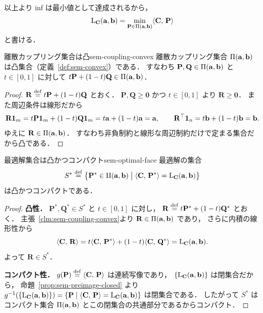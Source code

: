 以上より inf は最小値として達成されるから，
\[
  \mathrm{L}_{\mathbf{C}}(\mathbf{a}, \mathbf{b})
  = \min_{\mathbf{P} \in \Pi(\mathbf{a}, \mathbf{b})} \langle \mathbf{C},\, \mathbf{P} \rangle
\]
と書ける．

\begin{claim}{離散カップリング集合は凸}{sem-coupling-convex}
  離散カップリング集合 $\Pi(\mathbf{a}, \mathbf{b})$ は凸集合（定義~\ref{def:sem-convex}）である．
  すなわち $\mathbf{P}, \mathbf{Q} \in \Pi(\mathbf{a}, \mathbf{b})$ と
  $t \in [0,1]$ に対して
  $t\mathbf{P} + (1-t)\mathbf{Q} \in \Pi(\mathbf{a}, \mathbf{b})$．
\end{claim}

\begin{proof}
  $\mathbf{R} \overset{\mathrm{def}}{=} t\mathbf{P} + (1-t)\mathbf{Q}$ とおく．
  $\mathbf{P}, \mathbf{Q} \geq \mathbf{0}$ かつ $t \in [0,1]$ より $\mathbf{R} \geq \mathbf{0}$．
  また周辺条件は線形だから
  \[
    \mathbf{R}\mathbf{1}_m
    = t\mathbf{P}\mathbf{1}_m + (1-t)\mathbf{Q}\mathbf{1}_m
    = t\mathbf{a} + (1-t)\mathbf{a} = \mathbf{a},
    \qquad
    \mathbf{R}^\top\mathbf{1}_n
    = t\mathbf{b} + (1-t)\mathbf{b} = \mathbf{b}.
  \]
  ゆえに $\mathbf{R} \in \Pi(\mathbf{a}, \mathbf{b})$．
  すなわち非負制約と線形な周辺制約だけで定まる集合だから凸である．
\end{proof}

\begin{claim}{最適解集合は凸かつコンパクト}{sem-optimal-face}
  最適解の集合
  \[
    S^*
    \overset{\mathrm{def}}{=}
    \bigl\{ \mathbf{P}^* \in \Pi(\mathbf{a}, \mathbf{b})
    \bigm|
    \langle \mathbf{C},\, \mathbf{P}^* \rangle = \mathrm{L}_{\mathbf{C}}(\mathbf{a}, \mathbf{b})
    \bigr\}
  \]
  は凸かつコンパクトである．
\end{claim}

\begin{proof}
  \textbf{凸性．}
  $\mathbf{P}^*, \mathbf{Q}^* \in S^*$ と $t \in [0,1]$ に対し，
  $\mathbf{R} \overset{\mathrm{def}}{=} t\mathbf{P}^* + (1-t)\mathbf{Q}^*$ とおく．
  主張~\ref{clm:sem-coupling-convex}より $\mathbf{R} \in \Pi(\mathbf{a}, \mathbf{b})$ であり，
  さらに内積の線形性から
  \[
    \langle \mathbf{C},\, \mathbf{R} \rangle
    = t\langle \mathbf{C},\, \mathbf{P}^* \rangle + (1-t)\langle \mathbf{C},\, \mathbf{Q}^* \rangle
    = \mathrm{L}_{\mathbf{C}}(\mathbf{a}, \mathbf{b}).
  \]
  よって $\mathbf{R} \in S^*$．

  \textbf{コンパクト性．}
  $g(\mathbf{P}) \overset{\mathrm{def}}{=} \langle \mathbf{C},\, \mathbf{P} \rangle$ は連続写像であり，
  $\{\mathrm{L}_{\mathbf{C}}(\mathbf{a},\mathbf{b})\}$ は閉集合だから，
  命題~\ref{prop:sem-preimage-closed} より
  $g^{-1}(\{\mathrm{L}_{\mathbf{C}}(\mathbf{a},\mathbf{b})\}) = \{\mathbf{P} \mid \langle \mathbf{C},\, \mathbf{P} \rangle = \mathrm{L}_{\mathbf{C}}(\mathbf{a},\mathbf{b})\}$
  は閉集合である．
  したがって $S^*$ はコンパクト集合 $\Pi(\mathbf{a},\mathbf{b})$ とこの閉集合の共通部分であるからコンパクト．
\end{proof}

